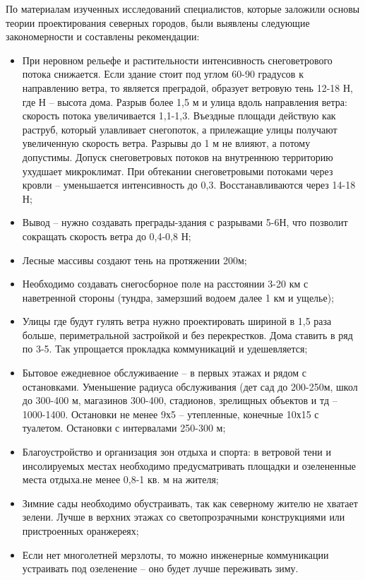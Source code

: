 По материалам изученных исследований специалистов, которые заложили основы теории проектирования северных городов, были выявлены следующие закономерности и составлены рекомендации:
\begin{itemize}
    \item При неровном рельефе и растительности интенсивность снеговетрового потока снижается. Если здание стоит под углом 60-90 градусов к направлению ветра, то является преградой, образует ветровую тень 12-18 Н, где Н – высота дома. Разрыв более 1,5 м и улица вдоль направления ветра: скорость потока увеличивается 1,1-1,3. Въездные площади действую как раструб, который улавливает снегопоток, а прилежащие улицы получают увеличенную скорость ветра. Разрывы до 1 м не влияют, а потому допустимы. Допуск снеговетровых потоков на внутреннюю территорию ухудшает микроклимат. При обтекании снеговетровыми потоками через кровли – уменьшается интенсивность до 0,3. Восстанавливаются через 14-18 Н;
    \item Вывод – нужно создавать преграды-здания с разрывами 5-6Н, что позволит сокращать скорость ветра до 0,4-0,8 Н;
    \item Лесные массивы создают тень на протяжении 200м;
    \item Необходимо создавать снегосборное поле на расстоянии 3-20 км с наветренной стороны (тундра, замерзший водоем далее 1 км и ущелье);
    \item Улицы где будут гулять ветра нужно проектировать шириной в 1,5 раза больше, периметральной застройкой и без перекрестков. Дома ставить в ряд по 3-5. Так упрощается прокладка коммуникаций и удешевляется;
    \item Бытовое ежедневное обслуживаение – в первых этажах и рядом с остановками. Уменьшение радиуса обслуживания (дет сад до 200-250м, школ до 300-400 м, магазинов 300-400, стадионов, зрелищных объектов и тд – 1000-1400. Остановки не менее 9х5 – утепленные, конечные 10х15 с туалетом. Остановки с интервалами 250-300 м;
    \item Благоустройство и организация зон отдыха и спорта: в ветровой тени и инсолируемых местах необходимо предусматривать площадки и озелененные места отдыха.не менее 0,8-1 кв. м на жителя;
    \item Зимние сады необходимо обустраивать, так как северному жителю не хватает зелени. Лучше в верхних этажах со светопрозрачными конструкциями или пристроенных оранжереях;
    \item Если нет многолетней мерзлоты, то можно инженерные коммуникации устраивать под озеленение – оно будет лучше переживать зиму.
\end{itemize}

